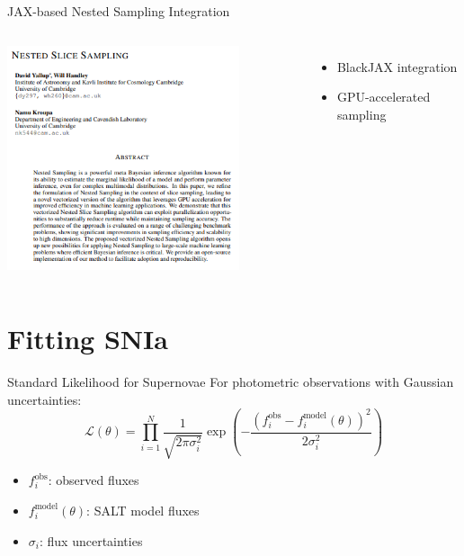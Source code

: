 \documentclass[aspectratio=169]{beamer}
\begin{document}
\begin{frame}{JAX-based Nested Sampling Integration}
  \begin{columns}
      \centering
      \includegraphics[width=0.8\textwidth]{images/nested_sampling_paper.png}
      \begin{itemize}
        \item BlackJAX integration
        \item GPU-accelerated sampling
      \end{itemize}
  \end{columns}
\end{frame}

\section{Fitting SNIa}

\begin{frame}{Standard Likelihood for Supernovae}
  \centering
  For photometric observations with Gaussian uncertainties:
  \begin{equation*}
    \mathcal{L}(\theta) = \prod_{i=1}^{N} \frac{1}{\sqrt{2\pi\sigma_i^2}} \exp\left(-\frac{(f_i^{\text{obs}} - f_i^{\text{model}}(\theta))^2}{2\sigma_i^2}\right)
  \end{equation*}
  \begin{itemize}
    \item $f_i^{\text{obs}}$: observed fluxes
    \item $f_i^{\text{model}}(\theta)$: SALT model fluxes 
    \item $\sigma_i$: flux uncertainties
  \end{itemize}
\end{frame}
\end{document}
